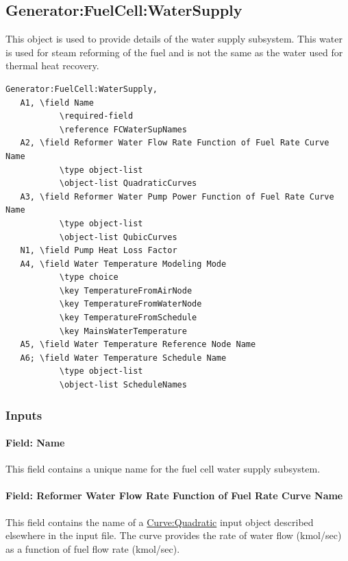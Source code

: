 \subsection{Generator:FuelCell:WaterSupply}\label{generatorfuelcellwatersupply}

This object is used to provide details of the water supply subsystem. This water is used for steam reforming of the fuel and is not the same as the water used for thermal heat recovery.

\begin{lstlisting}
Generator:FuelCell:WaterSupply,
   A1, \field Name
           \required-field
           \reference FCWaterSupNames
   A2, \field Reformer Water Flow Rate Function of Fuel Rate Curve Name
           \type object-list
           \object-list QuadraticCurves
   A3, \field Reformer Water Pump Power Function of Fuel Rate Curve Name
           \type object-list
           \object-list QubicCurves
   N1, \field Pump Heat Loss Factor
   A4, \field Water Temperature Modeling Mode
           \type choice
           \key TemperatureFromAirNode
           \key TemperatureFromWaterNode
           \key TemperatureFromSchedule
           \key MainsWaterTemperature
   A5, \field Water Temperature Reference Node Name
   A6; \field Water Temperature Schedule Name
           \type object-list
           \object-list ScheduleNames
\end{lstlisting}

\subsubsection{Inputs}\label{inputs-15-003}

\paragraph{Field: Name}\label{field-name-17-000}

This field contains a unique name for the fuel cell water supply subsystem.

\paragraph{Field: Reformer Water Flow Rate Function of Fuel Rate Curve Name}\label{field-reformer-water-flow-rate-function-of-fuel-rate-curve-name}

This field contains the name of a \hyperref[curvequadratic]{Curve:Quadratic} input object described elsewhere in the input file. The curve provides the rate of water flow (kmol/sec) as a function of fuel flow rate (kmol/sec).

